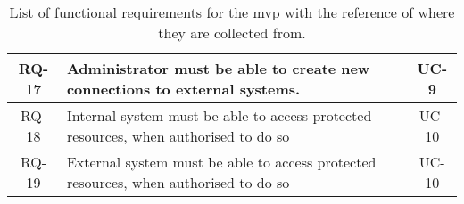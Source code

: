 \begin{table}[H]
\begin{tabular}{|c|p{12cm}|c|}
    \hline
    \hline
    RQ-17&Administrator must be able to create new connections to external systems.&UC-9\\
    \hline
    \hline
    RQ-18&Internal system must be able to access protected resources, when authorised to do so&UC-10\\
    \hline
    RQ-19&External system must be able to access protected resources, when authorised to do so&UC-10\\
    \hline
    \end{tabular}
    \caption{List of functional requirements for the \acrshort{mvp} with the reference of where they are collected from.}
    \label{tab:functional_requirements}
\end{table}